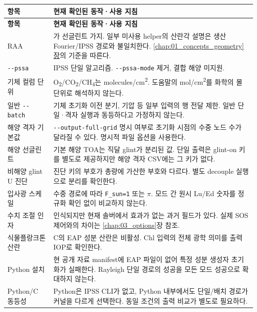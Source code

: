 {\TableFont
\begin{longtable}{@{}>{\raggedright\arraybackslash}p{}>{\raggedright\arraybackslash}p{}@{}}
\toprule
\textbf{항목} & \textbf{현재 확인된 동작·사용 지침} \\
\midrule
\endfirsthead
\toprule
\textbf{항목} & \textbf{현재 확인된 동작·사용 지침} \\
\midrule
\endhead
\bottomrule
\endfoot
RAA & 180\textdegree{}가 선글린트 가지. 일부 미사용 helper의 산란각 설명은 생산 Fourier/IPSS 경로와 불일치한다. \hyperref[chap:01_concepts_geometry]{\ref*{chap:01_concepts_geometry}장}의 기준을 따른다. \\
\texttt{-\allowbreak{}-\allowbreak{}pssa} & IPSS 단일 알고리즘. \texttt{-\allowbreak{}-\allowbreak{}pssa-\allowbreak{}mode} 제거, 결합 해양 미지원. \\
기체 컬럼 단위 & O\textsubscript{2}/CO\textsubscript{2}/CH\textsubscript{4}는 molecules/cm\textsuperscript{2}. 도움말의 mol/cm\textsuperscript{2}를 화학의 몰 단위로 해석하지 않는다. \\
일반 \texttt{-\allowbreak{}-\allowbreak{}batch} & 기체 초기화 이전 분기, 기압 등 일부 입력의 행 전달 제한. 일반 단일·격자 실행과 동등하다고 가정하지 않는다. \\
해양 격자 기본값 & \texttt{-\allowbreak{}-\allowbreak{}output-\allowbreak{}full-\allowbreak{}grid} 명시 여부로 초기화 시점의 수중 노드 수가 달라질 수 있다. 명시적 파일 옵션을 사용한다. \\
해양 선글린트 & 기본 해양 TOA는 직달 glint가 분리된 값. 단일 출력은 glint-on 키를 별도로 제공하지만 해양 격자 CSV에는 그 키가 없다. \\
비해양 glint U 진단 & 진단 키의 부호가 총량에 가산한 부호와 다르다. 별도 decouple 실행으로 분리를 확인한다. \\
입사광 스케일 & 수중 경로에 따라 \texttt{F\_\allowbreak{}sun=\allowbreak{}1} 또는 \ensuremath{\pi}. 모드 간 원시 Lu/Ed 숫자를 정규화 확인 없이 비교하지 않는다. \\
수치 조절 인자 & 인식되지만 현재 솔버에서 효과가 없는 과거 필드가 있다. 실제 SOS 제어와의 차이는 \ref{chap:03_options}장 참조. \\
식물플랑크톤 산란 & C의 EAP 성분 산란은 비활성. Chl 입력의 전체 광학 의미를 출력 IOP로 확인한다. \\
Python 설치 & 현 공개 자료 manifest에 EAP 파일이 없어 특정 성분 생성자 초기화가 실패한다. Rayleigh 단일 경로의 성공을 모든 모드 성공으로 확대하지 않는다. \\
Python/C 동등성 & Python은 IPSS CLI가 없고, Python 내부에서도 단일/배치 경로가 커널을 다르게 선택한다. 동일 조건의 출력 비교가 별도로 필요하다. \\
\end{longtable}
}

